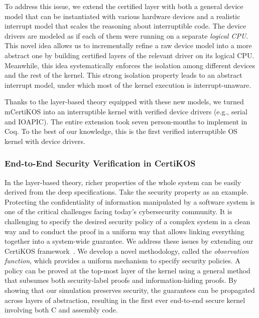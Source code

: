 \documentclass[a4paper, 10pt]{article}
\begin{document}
\begin{small}
To address this issue, we extend the certified layer with
both a general device model that can be
instantiated with various hardware devices and a realistic
interrupt model that scales the reasoning
about interruptible code. 
The device drivers are modeled
as if each of them were running on a  separate \emph{logical CPU}. This novel idea allows us to
incrementally refine a raw
device model into a more abstract one
by building certified layers of the relevant driver on its logical CPU.
Meanwhile, this idea systematically enforces
the isolation among different devices and the
rest of the kernel. This strong isolation property 
leads to an abstract interrupt model, under which
most of the kernel execution is interrupt-unaware.

Thanks to the layer-based theory equipped with these new models,
we turned mCertiKOS
into an  interruptible kernel with verified  device
drivers (e.g., serial and IOAPIC). 
The entire extension  took  seven person-months
to implement in Coq.
To the best of our knowledge, this is the first verified
interruptible OS kernel with device drivers.

\subsubsection*{\small End-to-End Security Verification in CertiKOS}
In the layer-based theory, richer properties of the whole system can be
easily derived  from the deep specifications.
Take the security property as an example.
Protecting the confidentiality of information manipulated by
a software system is one of the critical challenges
facing today's cybersecurity community. 
It is  challenging to specify the desired security policy
of a complex system in a clean way
and to conduct the proof in a uniform way
that allows linking everything together into
a system-wide guarantee.
We address these issues by extending our CertiKOS framework~\cite{pldi16-security}. 
We develop a novel
methodology, called the \emph{observation function}, 
which provides a  uniform mechanism
to specify  security policies.
A policy can be proved at the top-most layer of the kernel
 using a general method that subsumes both security-label proofs and
information-hiding proofs.
By showing that our simulation preserves security,
the guarantees can be propagated across layers of abstraction,
 resulting in
the first ever end-to-end secure kernel involving both C and assembly code.

\begin{comment}
 and using a special
kind of simulation that is guaranteed to preserve security


\end{comment}
\end{small}
\end{document}
